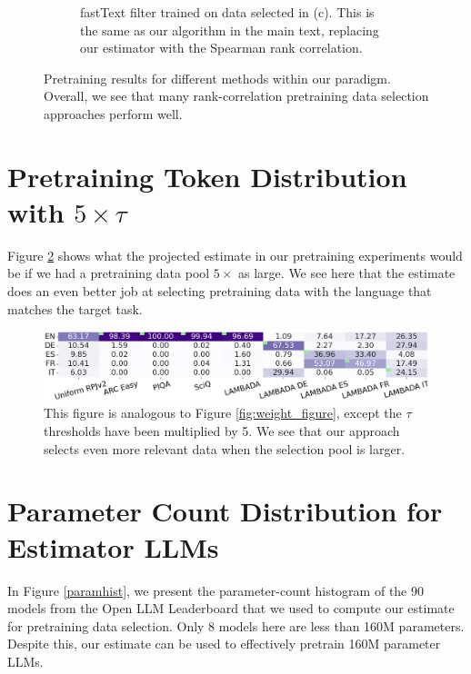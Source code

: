 \documentclass{article} %
\begin{document}
\begin{figure}[t]
\begin{subfigure}[b]{0.49\textwidth}
        \caption{fastText filter trained on data selected in (c). This is the same as our algorithm in the main text, replacing our estimator with the Spearman rank correlation.}
    \end{subfigure}
    \caption{Pretraining results for different methods within our paradigm. Overall, we see that many rank-correlation pretraining data selection approaches perform well.}
    \label{additional_pretraining_results}
\end{figure}

\section{Pretraining Token Distribution with \texorpdfstring{$5 \times \tau$}{5xtau}}
\label{app:5_tau}

Figure \ref{fig:weight_figure_5_tau} shows what the projected estimate in our pretraining experiments would be if we had a pretraining data pool $5\times$ as large. We see here that the estimate does an even better job at selecting pretraining data with the language that matches the target task.

\begin{figure}[t]
\centering
\includegraphics[width=\linewidth]{images/token-dist-heatmap-5-tau.png}

\caption{This figure is analogous to Figure \ref{fig:weight_figure}, except the $\tau$ thresholds have been multiplied by 5. We see that our approach selects even more relevant data when the selection pool is larger.}
\label{fig:weight_figure_5_tau}
\end{figure}

\section{Parameter Count Distribution for Estimator LLMs}
\label{app:histogram}

In Figure \ref{paramhist}, we present the parameter-count histogram of the 90 models from the Open LLM Leaderboard \citep{openllmleaderboard} that we used to compute our estimate for pretraining data selection. Only 8 models here are less than 160M parameters. Despite this, our estimate can be used to effectively pretrain 160M parameter LLMs.
\end{document}
